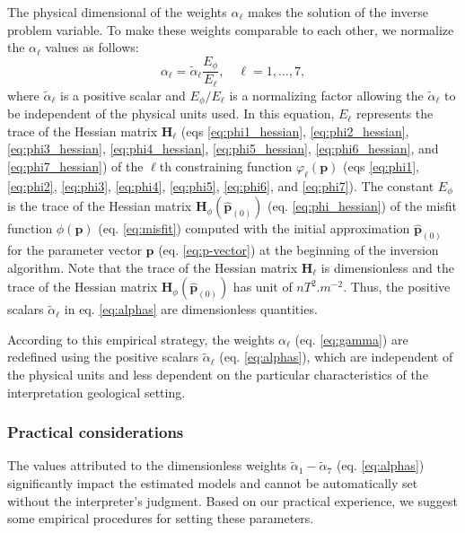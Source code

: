 The physical dimensional of the weights $ \alpha_{\ell}$ makes the solution of the inverse problem variable. 
To make these weights comparable to each other, we normalize the $ \alpha_{\ell} $ 
values as follows:
\begin{equation}\label{eq:alphas}
\alpha_{\ell} = \tilde{\alpha}_\ell \frac{E_\phi}{E_\ell}, \quad \ell = 1,\dots, 7,
\end{equation}
where $\tilde{\alpha}_\ell$ is a positive scalar and $ E_\phi/E_\ell $ is a normalizing
factor allowing the $\tilde{\alpha}_\ell$ to be independent of the physical units used.
In this equation, $ E_\ell $ represents the 
trace of the Hessian matrix $\mathbf{H}_{\ell}$ (eqs \ref{eq:phi1_hessian}, 
\ref{eq:phi2_hessian}, \ref{eq:phi3_hessian}, \ref{eq:phi4_hessian}, \ref{eq:phi5_hessian}, 
\ref{eq:phi6_hessian}, and \ref{eq:phi7_hessian}) of the $\ell$th constraining function 
$\varphi_{\ell}(\mathbf{p})$ (eqs \ref{eq:phi1}, \ref{eq:phi2}, \ref{eq:phi3}, 
\ref{eq:phi4}, \ref{eq:phi5}, \ref{eq:phi6}, and \ref{eq:phi7}). 
The constant $E_\phi$ is the trace of the Hessian matrix 
$\mathbf{H}_{\phi}(\hat{\mathbf{p}}_{(0)})$ (eq. \ref{eq:phi_hessian}) of the misfit function 
$\phi(\mathbf{p})$ (eq. \ref{eq:misfit}) computed with the initial approximation $\hat{\mathbf{p}}_{(0)}$ 
for the parameter vector $ \mathbf{p} $ (eq. \ref{eq:p-vector}) at the beginning of the inversion algorithm. 
Note that the trace of the Hessian matrix $\mathbf{H}_{\ell}$ is dimensionless and 
the trace of the Hessian matrix $\mathbf{H}_{\phi}(\hat{\mathbf{p}}_{(0)})$ has unit of $nT^{2}.m^{-2}$.
Thus, the positive scalars $\tilde{\alpha}_\ell$ in eq. \ref{eq:alphas} are dimensionless quantities.

According to this empirical strategy, the weights $ \alpha_{\ell} $ 
(eq. \ref{eq:gamma}) are redefined using the positive scalars $\tilde{\alpha}_\ell$ 
(eq. \ref{eq:alphas}), which are independent of the physical units and less dependent 
on the particular characteristics of the interpretation geological setting.


\subsubsection{Practical considerations}

The values attributed to the dimensionless weights $\tilde{\alpha}_{1} - \tilde{\alpha}_{7}$ 
(eq. \ref{eq:alphas}) significantly impact the estimated models and cannot be 
automatically set without the interpreter’s judgment. 
Based on our practical experience, we suggest some 
empirical procedures for setting these parameters.


